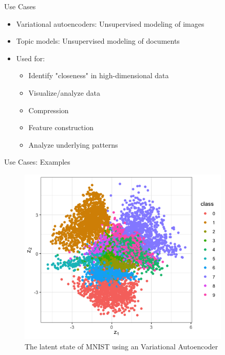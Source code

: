 \documentclass[10pt]{beamer}
\begin{document}
\begin{frame}{Use Cases}

\begin{itemize}
\item Variational autoencoders: Unsupervised modeling of {\color{uured}images}
\item Topic models: Unsupervised modeling of {\color{uured}documents}
\end{itemize}

\pause

\begin{itemize}
\item Used for:
\begin{itemize}
\item Identify "{\color{uured}closeness}" in high-dimensional data\pause
\item {\color{uured}Visualize/analyze} data\pause
\item {\color{uured}Compression}\pause
\item {\color{uured}Feature construction}\pause
\item Analyze underlying {\color{uured}patterns}
\end{itemize}
\end{itemize}

\end{frame}

\begin{frame}{Use Cases: Examples}

\begin{figure}[h]
\centering
\includegraphics[width=0.9\textwidth]{fig/MNIST_VAE_latent.png}
\caption{The latent state of MNIST using an Variational Autoencoder}
\end{figure}

\end{frame}
\end{document}
